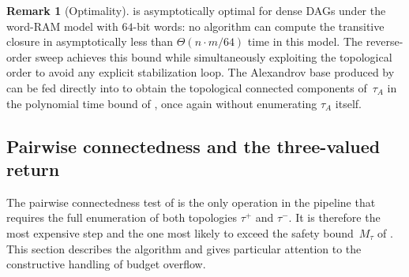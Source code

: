 \documentclass[11pt,a4paper]{article}
\theoremstyle{plain}
\theoremstyle{definition}
\newtheorem{remark}[theorem]{Remark}
\newcommand{\taufwd}{\tau^{+}}
\newcommand{\taubwd}{\tau^{-}}
\begin{document}
\begin{remark}[Optimality]\label{rem:alexandrov-optimal}
 is asymptotically optimal for dense DAGs under the
word-RAM model with $64$-bit words: no algorithm can compute the transitive
closure in asymptotically less than $\Theta(n \cdot m / 64)$ time in this
model.  The reverse-order sweep achieves this bound while simultaneously
exploiting the topological order to avoid any explicit stabilization loop.
The Alexandrov base produced by  can be fed directly
into  to obtain the topological
connected components of~$\tau_A$ in the polynomial time bound of
, once again without enumerating
$\tau_A$ itself.
\end{remark}


\subsection{Pairwise connectedness and the three-valued return}%
\label{subsec:pairwise-algorithm}

The pairwise connectedness test of  is the
only operation in the pipeline that requires the full enumeration of both
topologies $\taufwd$ and $\taubwd$.  It is therefore the most expensive
step and the one most likely to exceed the safety bound~$M_{\tau}$ of
.  This section describes the algorithm and gives
particular attention to the constructive handling of budget overflow.
\end{document}
